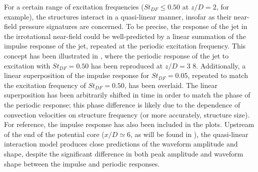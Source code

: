 For a certain range of excitation frequencies ($St_{DF} \leq 0.50$ at $z/D = 2$, for example), the structures interact in a quasi-linear manner, insofar as their near-field pressure signatures are concerned. 
To be precise, the response of the jet in the irrotational near-field could be well-predicted by a linear summation of the impulse response of the jet, repeated at the periodic excitation frequency. 
This concept has been illustrated in , where the periodic response of the jet to excitation with $St_{DF} = 0.50$ has been reproduced at $z/D = 3$ 8. 
Additionally, a linear superposition of the impulse response for $St_{DF} = 0.05$, repeated to match the excitation frequency of $St_{DF} = 0.50$, has been overlaid. 
The linear superposition has been arbitrarily shifted in time in order to match the phase of the periodic response; this phase difference is likely due to the dependence of convection velocities on structure frequency \citep{Veltin2011} (or more accurately, structure size). 
For reference, the impulse response has also been included in the plots. 
Upstream of the end of the potential core ($x/D \simeq 6$, as will be found in ), the quasi-linear interaction model produces close predictions of the waveform amplitude and shape, despite the significant difference in both peak amplitude and waveform shape between the impulse and periodic responses. 

